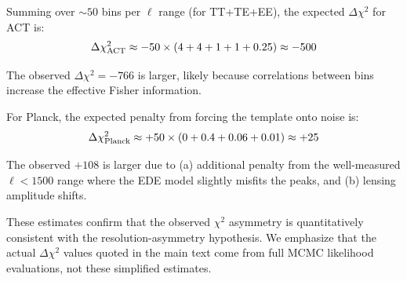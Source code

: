 \documentclass[twocolumn,showpacs,preprintnumbers,amsmath,amssymb,prd]{revtex4-2}
\begin{document}
Summing over $\sim 50$ bins per $\ell$ range (for TT+TE+EE), the expected 
$\Delta\chi^2$ for ACT is:
\begin{equation}
\Delta\chi^2_{\rm ACT} \approx -50 \times (4 + 4 + 1 + 1 + 0.25) \approx -500
\end{equation}

The observed $\Delta\chi^2 = -766$ is larger, likely because correlations 
between bins increase the effective Fisher information.

For Planck, the expected penalty from forcing the template onto noise is:
\begin{equation}
\Delta\chi^2_{\rm Planck} \approx +50 \times (0 + 0.4 + 0.06 + 0.01) \approx +25
\end{equation}

The observed $+108$ is larger due to (a) additional penalty from the 
well-measured $\ell < 1500$ range where the EDE model slightly misfits 
the peaks, and (b) lensing amplitude shifts.

These estimates confirm that the observed $\chi^2$ asymmetry is quantitatively 
consistent with the resolution-asymmetry hypothesis. We emphasize that the 
actual $\Delta\chi^2$ values quoted in the main text come from full MCMC 
likelihood evaluations, not these simplified estimates.
\end{document}
